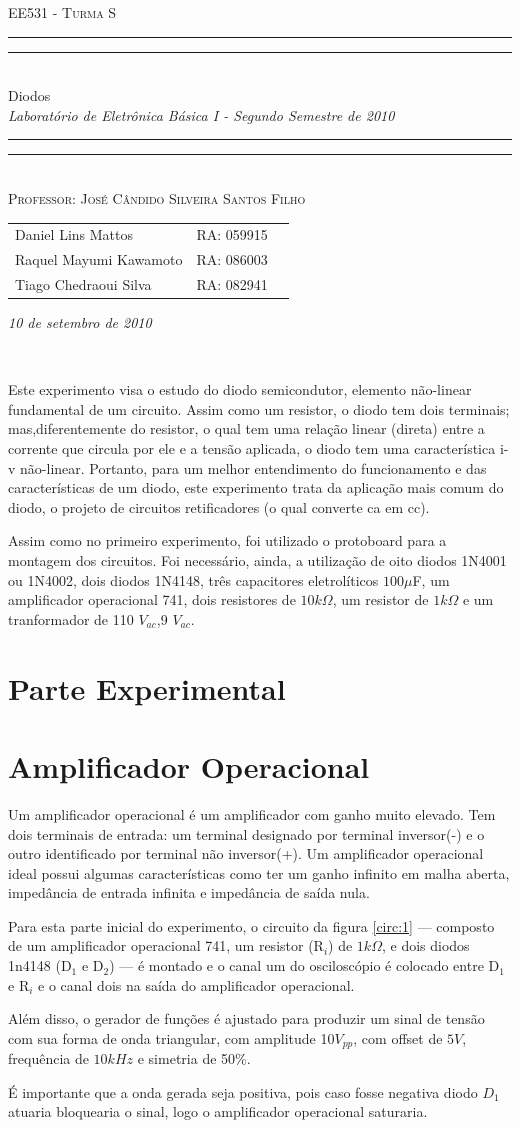 \documentclass[a4paper]{article} %
\date{Setembro 10, 2010}
\newcommand*{\titleTMB}{\begingroup \centering \settowidth{\unitlength}{\LARGE EE531} {\large\scshape EE531 - Turma S}\\[0.2\baselineskip] \rule{11.0cm}{1.6pt}\vspace*{-\baselineskip}\vspace*{2pt} \rule{11.0cm}{0.4pt}\\[\baselineskip] {\LARGE  Diodos}\\\vspace*{\baselineskip}  {\itshape Laboratório de Eletrônica Básica I - Segundo Semestre de 2010}\\ \rule{11.0cm}{0.4pt}\vspace*{-\baselineskip}\vspace{3.2pt} \rule{11.0cm}{1.6pt}\\[\baselineskip] {\large\scshape Professor: José Cândido Silveira Santos Filho}\par \vfill {\normalsize   \scshape 
    \begin{center} 
      \begin{tabular}{  l  l  p{5cm} } 
 	Daniel Lins Mattos & RA: 059915\\
        Raquel Mayumi Kawamoto & RA: 086003\\
        Tiago Chedraoui Silva  & RA: 082941\\
      \end{tabular} \end{center}
    \itshape 10 de setembro de 2010    }\\[\baselineskip] \vspace{3.2pt} \endgroup}
\begin{document}
\titleTMB 
\newpage


Este experimento visa o estudo do diodo semicondutor, elemento não-linear
fundamental de um circuito. Assim como um resistor, o diodo tem dois terminais; mas,diferentemente do resistor, o qual tem uma relação linear (direta) entre a corrente que circula por ele e a tensão aplicada, o diodo tem uma característica i-v não-linear.
      Portanto, para um melhor entendimento do funcionamento e das características de um diodo, este experimento trata da aplicação mais comum do diodo, o projeto de circuitos retificadores (o qual converte ca em cc).

        Assim como no primeiro experimento, foi utilizado o protoboard para a montagem dos
circuitos. Foi necessário, ainda, a utilização de oito diodos 1N4001 ou 1N4002, dois diodos
1N4148, três capacitores eletrolíticos $100\mu$F,  um amplificador operacional 741, dois resistores
de $10k\Omega$, um resistor de $1k\Omega$ e um tranformador de 110 $V_{ac}$,9 $V_{ac}$.


\section*{Parte Experimental}
\section{Amplificador Operacional}
 \setcounter{figure}{0}
Um amplificador operacional é um amplificador com ganho  muito elevado. Tem dois terminais de entrada: um terminal designado por terminal inversor(-) e o outro identificado por terminal não inversor(+).
Um amplificador operacional ideal possui algumas características como ter um ganho infinito em malha aberta, impedância de entrada infinita e impedância de saída nula. 

 Para esta parte inicial do experimento, o circuito da figura \ref{circ:1} --- composto de um amplificador operacional 741, um resistor (R$_i$) de $1k\Omega$, e dois diodos 1n4148 (D$_1$ e D$_2$) --- é montado e o canal um do osciloscópio é colocado entre D$_1$ e R$_i$ e o canal dois na saída do amplificador operacional. 

Além disso, o gerador de funções é ajustado para produzir um sinal de tensão com sua forma de onda triangular, com amplitude 10$V_{pp}$, com offset de $5V$, frequência de $10kHz$ e simetria de 50\%. 

 É importante que a onda gerada seja positiva, pois caso fosse negativa diodo $D_1$ atuaria bloquearia o sinal, logo o amplificador operacional saturaria.
\end{document}
